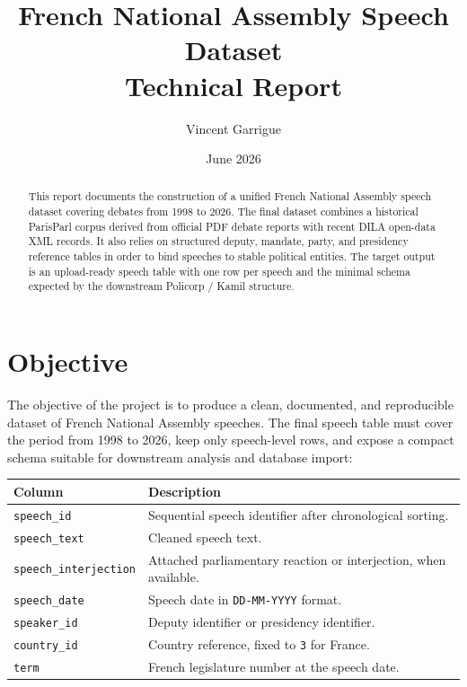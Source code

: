 \documentclass[11pt,a4paper]{article}
\title{French National Assembly Speech Dataset\\Technical Report}
\author{Vincent Garrigue}
\date{June 2026}
\begin{document}
\maketitle

\begin{abstract}
This report documents the construction of a unified French National Assembly
speech dataset covering debates from 1998 to 2026. The final dataset combines a
historical ParisParl corpus derived from official PDF debate reports with recent
DILA open-data XML records. It also relies on structured deputy, mandate,
party, and presidency reference tables in order to bind speeches to stable
political entities. The target output is an upload-ready speech table with one
row per speech and the minimal schema expected by the downstream Policorp /
Kamil structure.
\end{abstract}

\tableofcontents
\clearpage

\section{Objective}

The objective of the project is to produce a clean, documented, and
reproducible dataset of French National Assembly speeches. The final speech
table must cover the period from 1998 to 2026, keep only speech-level rows, and
expose a compact schema suitable for downstream analysis and database import:

\begin{center}
\begin{tabular}{ll}
\toprule
Column & Description \\
\midrule
\texttt{speech\_id} & Sequential speech identifier after chronological sorting. \\
\texttt{speech\_text} & Cleaned speech text. \\
\texttt{speech\_interjection} & Attached parliamentary reaction or interjection, when available. \\
\texttt{speech\_date} & Speech date in \texttt{DD-MM-YYYY} format. \\
\texttt{speaker\_id} & Deputy identifier or presidency identifier. \\
\texttt{country\_id} & Country reference, fixed to \texttt{3} for France. \\
\texttt{term} & French legislature number at the speech date. \\
\bottomrule
\end{tabular}
\end{center}
\end{document}
